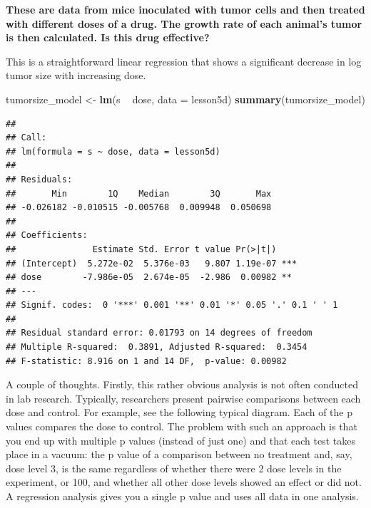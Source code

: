 \documentclass[]{book}
\newenvironment{Shaded}{\begin{snugshade}}{\end{snugshade}}
\newcommand{\DataTypeTok}[1]{\textcolor[rgb]{0.13,0.29,0.53}{#1}}
\newcommand{\KeywordTok}[1]{\textcolor[rgb]{0.13,0.29,0.53}{\textbf{#1}}}
\newcommand{\NormalTok}[1]{#1}
\newcommand{\OperatorTok}[1]{\textcolor[rgb]{0.81,0.36,0.00}{\textbf{#1}}}
\newcommand{\StringTok}[1]{\textcolor[rgb]{0.31,0.60,0.02}{#1}}
\begin{document}
\textbf{These are data from mice inoculated with tumor cells and then
treated with different doses of a drug. The growth rate of each animal's
tumor is then calculated. Is this drug effective?}

This is a straightforward linear regression that shows a significant
decrease in log tumor size with increasing dose.

\begin{Shaded}
\begin{Highlighting}[]
\NormalTok{tumorsize_model <-}\StringTok{ }\KeywordTok{lm}\NormalTok{(s }\OperatorTok{~}\StringTok{ }\NormalTok{dose, }\DataTypeTok{data =}\NormalTok{ lesson5d)}
\KeywordTok{summary}\NormalTok{(tumorsize_model)}
\end{Highlighting}
\end{Shaded}

\begin{verbatim}
## 
## Call:
## lm(formula = s ~ dose, data = lesson5d)
## 
## Residuals:
##       Min        1Q    Median        3Q       Max 
## -0.026182 -0.010515 -0.005768  0.009948  0.050698 
## 
## Coefficients:
##               Estimate Std. Error t value Pr(>|t|)    
## (Intercept)  5.272e-02  5.376e-03   9.807 1.19e-07 ***
## dose        -7.986e-05  2.674e-05  -2.986  0.00982 ** 
## ---
## Signif. codes:  0 '***' 0.001 '**' 0.01 '*' 0.05 '.' 0.1 ' ' 1
## 
## Residual standard error: 0.01793 on 14 degrees of freedom
## Multiple R-squared:  0.3891, Adjusted R-squared:  0.3454 
## F-statistic: 8.916 on 1 and 14 DF,  p-value: 0.00982
\end{verbatim}

A couple of thoughts. Firstly, this rather obvious analysis is not often
conducted in lab research. Typically, researchers present pairwise
comparisons between each dose and control. For example, see the
following typical diagram. Each of the p values compares the dose to
control. The problem with such an approach is that you end up with
multiple p values (instead of just one) and that each test takes place
in a vacuum: the p value of a comparison between no treatment and, say,
dose level 3, is the same regardless of whether there were 2 dose levels
in the experiment, or 100, and whether all other dose levels showed an
effect or did not. A regression analysis gives you a single p value and
uses all data in one analysis.
\end{document}
